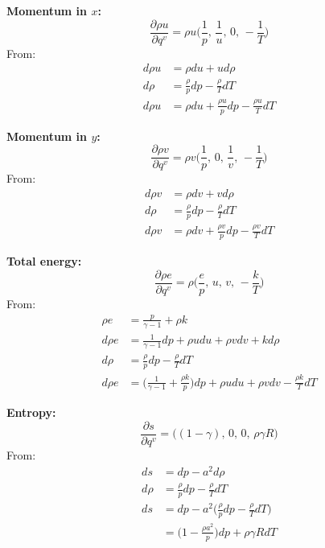 \documentclass{article}
\begin{document}
\textbf{Momentum in $x$:}
\begin{equation*}
    \frac{\partial \rho u}{\partial q^v} = \rho u \big( \frac{1}{p},\, \frac{1}{u},\, 0,\, -\frac{1}{T} \big)
\end{equation*}
From:
\begin{equation*}
    \begin{split}
        d\rho u & = \rho du + ud\rho \\
        d\rho & = \frac{\rho}{p}dp - \frac{\rho}{T}dT \\
        d\rho u & = \rho du + \frac{\rho u}{p} dp - \frac{\rho u}{T} dT
    \end{split}
\end{equation*}

\textbf{Momentum in $y$:}
\begin{equation*}
    \frac{\partial \rho v}{\partial q^v} = \rho v \big( \frac{1}{p},\, 0,\, \frac{1}{v},\, -\frac{1}{T} \big)
\end{equation*}
From:
\begin{equation*}
    \begin{split}
        d\rho v & = \rho dv + vd\rho \\
        d\rho & = \frac{\rho}{p}dp - \frac{\rho}{T}dT \\
        d\rho v & = \rho dv + \frac{\rho v}{p} dp - \frac{\rho v}{T} dT
    \end{split}
\end{equation*}

\textbf{Total energy:}
\begin{equation*}
    \frac{\partial \rho e}{\partial q^v} = \rho \big( \frac{e}{p},\, u,\, v,\, -\frac{k}{T} \big)
\end{equation*}
From:
\begin{equation*}
    \begin{split}
        \rho e  & = \frac{p}{\gamma-1} + \rho k \\
        d\rho e & = \frac{1}{\gamma-1}dp + \rho u du + \rho v dv + kd\rho \\
        d\rho & = \frac{\rho}{p}dp - \frac{\rho}{T}dT \\
        d\rho e & = \big(\frac{1}{\gamma-1} + \frac{\rho k}{p} \big)dp + \rho u du + \rho v dv - \frac{\rho k}{T}dT
    \end{split}
\end{equation*}

\textbf{Entropy:}
\begin{equation*}
    \frac{\partial s}{\partial q^v} = \big( (1-\gamma),\, 0,\, 0,\, \rho \gamma R \big)
\end{equation*}
From:
\begin{equation*}
    \begin{split}
        ds & = dp - a^2 d\rho \\
        d\rho & = \frac{\rho}{p}dp - \frac{\rho}{T}dT \\
        ds & = dp - a^2\big( \frac{\rho}{p}dp - \frac{\rho}{T}dT \big) \\
           & = \big(1 - \frac{\rho a^2}{p}\big)dp + \rho \gamma R dT
    \end{split}
\end{equation*}
\end{document}
